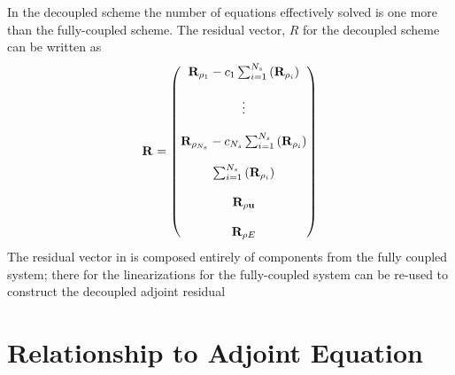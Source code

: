 \documentclass[a4paper]{report}
\begin{document}
In the decoupled scheme the number of equations effectively solved is one more
than the fully-coupled scheme.  The residual vector, $R$ for the decoupled
scheme can be written as
\begin{equation}
  \mathbf R_{} =
  \begin{pmatrix}
    \mathbf R_{\rho_1} - c_1 \sum_{i=1}^{N_s}\left(\mathbf R_{\rho_i}\right) \\ \\
    \vdots \\ \\
    \mathbf R_{\rho_{N_s}} - c_{N_s} \sum_{i=1}^{N_s}\left(\mathbf R_{\rho_i}\right) \\ \\
    \sum_{i=1}^{N_s}\left(\mathbf R_{\rho_i}\right) \\ \\
    \mathbf R_{\rho \mathbf u} \\ \\
    \mathbf R_{\rho E}
  \end{pmatrix}
  \label{dc-res}
\end{equation}
The residual vector in  is composed entirely of components from
the fully coupled system; there for the linearizations for the fully-coupled
system can be re-used to construct the decoupled adjoint residual

\section{Relationship to Adjoint Equation}
\end{document}
